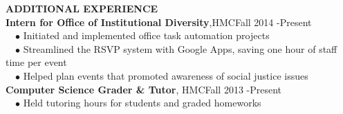 \documentclass[11pt]{article}
\newcommand{\sectionNL}{\\[-2pt]}
\newcommand{\customtab}{$\hspace{10pt} \bullet \hspace{2pt}$}
\newcommand{\customtabinline}{$\hspace{23pt}$}
\newcommand{\HMC}{HMC}
\newcommand{\rightAlign}{\hfill}
\begin{document}
\begin{flushleft}
{\textbf{ADDITIONAL EXPERIENCE } } \sectionNL
\textbf{Intern for Office of Institutional Diversity},\HMC \rightAlign Fall 2014 -Present \\
\customtab Initiated and implemented office task automation projects\\
\customtab Streamlined the RSVP system with Google Apps, saving one hour of staff time per event  \\
\customtab Helped plan events that promoted awareness of social justice issues \\

\textbf{Computer Science Grader \& Tutor}, \HMC \rightAlign Fall 2013 -Present \\ %
\customtab Held tutoring hours for students and graded homeworks

\end{flushleft}
\end{document}
